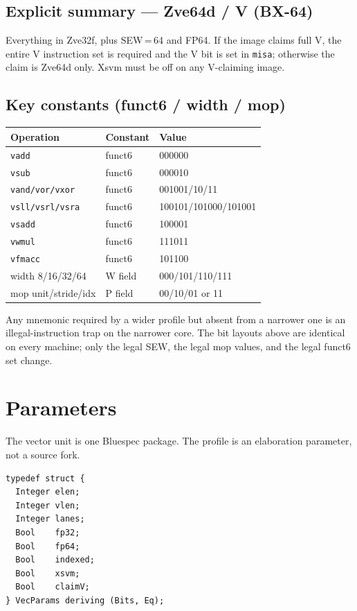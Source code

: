 \subsection{Explicit summary --- Zve64d / V (BX-64)}

Everything in Zve32f, plus SEW\,=\,64 and FP64. If the image claims full V, the entire V instruction set is required and the V bit is set in \texttt{misa}; otherwise the claim is Zve64d only. Xsvm must be off on any V-claiming image.

\subsection{Key constants (funct6 / width / mop)}

\begin{center}\small
\begin{tabular}{@{}lll@{}}
\toprule
Operation & Constant & Value \\
\midrule
\texttt{vadd} & funct6 & 000000 \\
\texttt{vsub} & funct6 & 000010 \\
\texttt{vand/vor/vxor} & funct6 & 001001/10/11 \\
\texttt{vsll/vsrl/vsra} & funct6 & 100101/101000/101001 \\
\texttt{vsadd} & funct6 & 100001 \\
\texttt{vwmul} & funct6 & 111011 \\
\texttt{vfmacc} & funct6 & 101100 \\
width 8/16/32/64 & W field & 000/101/110/111 \\
mop unit/stride/idx & P field & 00/10/01 or 11 \\
\bottomrule
\end{tabular}
\end{center}

Any mnemonic required by a wider profile but absent from a narrower one is an illegal-instruction trap on the narrower core. The bit layouts above are identical on every machine; only the legal SEW, the legal mop values, and the legal funct6 set change.

\section{Parameters}

The vector unit is one Bluespec package. The profile is an elaboration parameter, not a source fork.

\begin{lstlisting}
typedef struct {
  Integer elen;
  Integer vlen;
  Integer lanes;
  Bool    fp32;
  Bool    fp64;
  Bool    indexed;
  Bool    xsvm;
  Bool    claimV;
} VecParams deriving (Bits, Eq);
\end{lstlisting}

